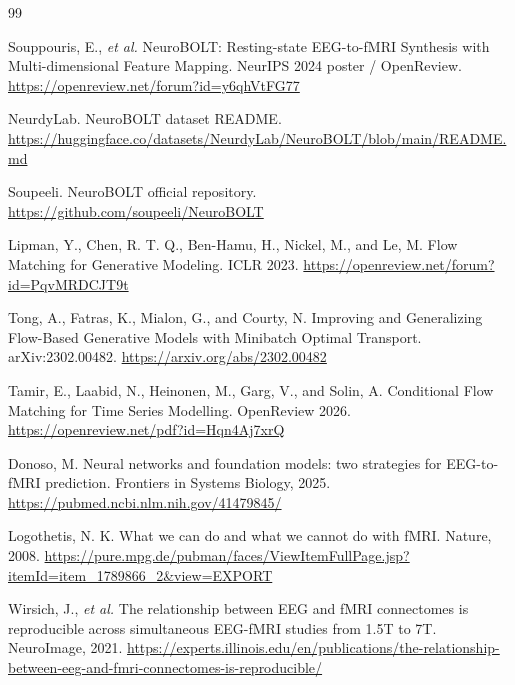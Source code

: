 \documentclass[11pt,a4paper]{ctexart}
\begin{document}
\begin{thebibliography}{99}

Souppouris, E., \emph{et al.}
\newblock NeuroBOLT: Resting-state EEG-to-fMRI Synthesis with Multi-dimensional Feature Mapping.
\newblock NeurIPS 2024 poster / OpenReview.
\newblock \url{https://openreview.net/forum?id=y6qhVtFG77}

NeurdyLab.
\newblock NeuroBOLT dataset README.
\newblock \url{https://huggingface.co/datasets/NeurdyLab/NeuroBOLT/blob/main/README.md}

Soupeeli.
\newblock NeuroBOLT official repository.
\newblock \url{https://github.com/soupeeli/NeuroBOLT}

Lipman, Y., Chen, R. T. Q., Ben-Hamu, H., Nickel, M., and Le, M.
\newblock Flow Matching for Generative Modeling.
\newblock ICLR 2023.
\newblock \url{https://openreview.net/forum?id=PqvMRDCJT9t}

Tong, A., Fatras, K., Mialon, G., and Courty, N.
\newblock Improving and Generalizing Flow-Based Generative Models with Minibatch Optimal Transport.
\newblock arXiv:2302.00482.
\newblock \url{https://arxiv.org/abs/2302.00482}

Tamir, E., Laabid, N., Heinonen, M., Garg, V., and Solin, A.
\newblock Conditional Flow Matching for Time Series Modelling.
\newblock OpenReview 2026.
\newblock \url{https://openreview.net/pdf?id=Hqn4Aj7xrQ}

Donoso, M.
\newblock Neural networks and foundation models: two strategies for EEG-to-fMRI prediction.
\newblock Frontiers in Systems Biology, 2025.
\newblock \url{https://pubmed.ncbi.nlm.nih.gov/41479845/}

Logothetis, N. K.
\newblock What we can do and what we cannot do with fMRI.
\newblock Nature, 2008.
\newblock \url{https://pure.mpg.de/pubman/faces/ViewItemFullPage.jsp?itemId=item_1789866_2\&view=EXPORT}

Wirsich, J., \emph{et al.}
\newblock The relationship between EEG and fMRI connectomes is reproducible across simultaneous EEG-fMRI studies from 1.5T to 7T.
\newblock NeuroImage, 2021.
\newblock \url{https://experts.illinois.edu/en/publications/the-relationship-between-eeg-and-fmri-connectomes-is-reproducible/}

\end{thebibliography}
\end{document}

